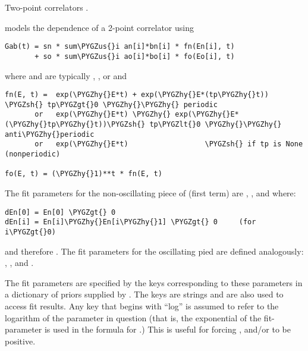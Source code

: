 \documentclass[letterpaper,10pt,english]{sphinxmanual}
\def\PYGZus{\char`\_}
\def\PYGZlt{\char`\<}
\def\PYGZgt{\char`\>}
\def\PYGZsh{\char`\#}
\def\PYGZhy{\char`\-}
\begin{document}
\begin{fulllineitems}
\label{corrfitter:corrfitter.Corr2}
Two-point correlators .

{\hyperref[corrfitter:corrfitter.Corr2]{}} models the  dependence of a 2-point correlator 
using

\begin{Verbatim}[commandchars=\\\{\}]
Gab(t) = sn * sum\PYGZus{}i an[i]*bn[i] * fn(En[i], t)
       + so * sum\PYGZus{}i ao[i]*bo[i] * fo(Eo[i], t)
\end{Verbatim}

where  and  are typically , , or  and

\begin{Verbatim}[commandchars=\\\{\}]
fn(E, t) =  exp(\PYGZhy{}E*t) + exp(\PYGZhy{}E*(tp\PYGZhy{}t)) \PYGZsh{} tp\PYGZgt{}0 \PYGZhy{}\PYGZhy{} periodic
       or   exp(\PYGZhy{}E*t) \PYGZhy{} exp(\PYGZhy{}E*(\PYGZhy{}tp\PYGZhy{}t))\PYGZsh{} tp\PYGZlt{}0 \PYGZhy{}\PYGZhy{} anti\PYGZhy{}periodic
       or   exp(\PYGZhy{}E*t)                  \PYGZsh{} if tp is None (nonperiodic)

fo(E, t) = (\PYGZhy{}1)**t * fn(E, t)
\end{Verbatim}

The fit parameters for the non-oscillating piece of  (first term)
are , , and  where:

\begin{Verbatim}[commandchars=\\\{\}]
dEn[0] = En[0] \PYGZgt{} 0
dEn[i] = En[i]\PYGZhy{}En[i\PYGZhy{}1] \PYGZgt{} 0     (for i\PYGZgt{}0)
\end{Verbatim}

and therefore . The fit parameters for
the oscillating pied are defined analogously: , ,
and .

The fit parameters are specified by the keys corresponding to these
parameters in a dictionary of priors supplied by {\hyperref[corrfitter:corrfitter.CorrFitter]{}}. The keys
are strings and are also used to access fit results. Any key that
begins with ``log'' is assumed to refer to the logarithm of the parameter
in question (that is, the exponential of the fit-parameter is used in
the formula for .) This is useful for forcing , 
and/or  to be positive.


\end{fulllineitems}
\end{document}
